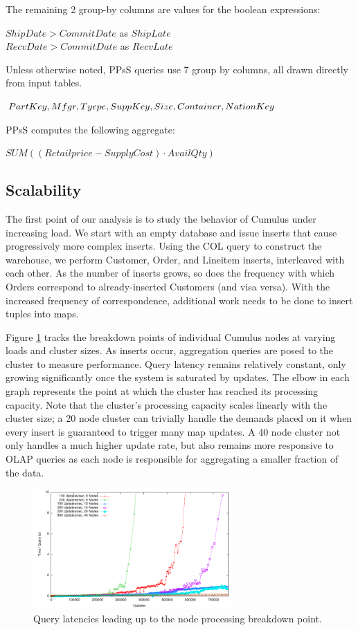 \noindent The remaining 2 group-by columns are values for the boolean expressions:

{\noindent $ShipDate > CommitDate$ as $ShipLate$\\
$RecvDate > CommitDate$ as $RecvLate$}

Unless otherwise noted, PPsS queries use 7 group by columns, all drawn directly from input tables.  

{\noindent $PartKey, Mfgr, Tyepe, SuppKey, \\
Size, Container, NationKey$}

PPsS computes the following aggregate:

{\noindent$SUM((Retailprice - SupplyCost) \cdot AvailQty)$}

\subsection{Scalability}

The first point of our analysis is to study the behavior of Cumulus under increasing load.  We start with an empty database and issue inserts that cause progressively more complex inserts.  Using the COL query to construct the warehouse, we perform Customer, Order, and Lineitem inserts, interleaved with each other.  As the number of inserts grows, so does the frequency with which Orders correspond to already-inserted Customers (and visa versa).  With the increased frequency of correspondence, additional work needs to be done to insert tuples into maps.  

Figure \ref{fig:expandingbreakdown} tracks the breakdown points of individual Cumulus nodes at varying loads and cluster sizes.  As inserts occur, aggregation queries are posed to the cluster to measure performance.  Query latency remains relatively constant, only growing significantly once the system is saturated by updates.  The elbow in each graph represents the point at which the cluster has reached its processing capacity.  Note that the cluster's processing capacity scales linearly with the cluster size; a 20 node cluster can trivially handle the demands placed on it when every insert is guaranteed to trigger many map updates.  A 40 node cluster not only handles a much higher update rate, but also remains more responsive to OLAP queries as each node is responsible for aggregating a smaller fraction of the data.

\begin{figure}
\begin{center}
\includegraphics[width=3.0in]{images/expandingbreakdown.pdf}
\caption{Query latencies leading up to the node processing breakdown point.}
\label{fig:expandingbreakdown}
\end{center}
\end{figure}

